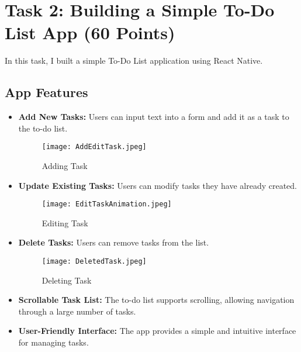 \documentclass{article}
\begin{document}
\section{Task 2: Building a Simple To-Do List App (60 Points)}
In this task, I built a simple To-Do List application using React Native.

\subsection{App Features}
\begin{itemize}
    \item \textbf{Add New Tasks:} Users can input text into a form and add it as a task to the to-do list.
    \begin{figure}[H]
        \centering
        \texttt{[image: AddEditTask.jpeg]}
        \caption{Adding Task}
    \end{figure}

    \item \textbf{Update Existing Tasks:} Users can modify tasks they have already created.
    \begin{figure}[H]
        \centering
        \texttt{[image: EditTaskAnimation.jpeg]}
        \caption{Editing Task}
    \end{figure}
    
    
    \item \textbf{Delete Tasks:} Users can remove tasks from the list.
    \begin{figure}[H]
        \centering
        \texttt{[image: DeletedTask.jpeg]}
        \caption{Deleting Task}
    \end{figure}
  
    
    \item \textbf{Scrollable Task List:} The to-do list supports scrolling, allowing navigation through a large number of tasks.

    \item \textbf{User-Friendly Interface:} The app provides a simple and intuitive interface for managing tasks.
\end{itemize}
\end{document}
